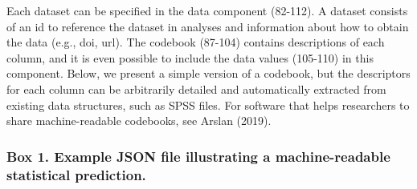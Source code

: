 \documentclass[doc,floatsintext]{apa6}
\begin{document}
Each dataset can be specified in the data component (82-112). A dataset consists of an id to reference the dataset in analyses and information about how to obtain the data (e.g., doi, url). The codebook (87-104) contains descriptions of each column, and it is even possible to include the data values (105-110) in this component. Below, we present a simple version of a codebook, but the descriptors for each column can be arbitrarily detailed and automatically extracted from existing data structures, such as SPSS files. For software that helps researchers to share machine-readable codebooks, see Arslan (2019).
\newpage

\hypertarget{box-1.-example-json-file-illustrating-a-machine-readable-statistical-prediction.}{%
\subsubsection{Box 1. Example JSON file illustrating a machine-readable statistical prediction.}\label{box-1.-example-json-file-illustrating-a-machine-readable-statistical-prediction.}}
\end{document}
